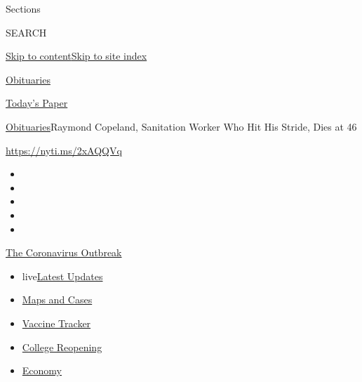 Sections

SEARCH

\protect\hyperlink{site-content}{Skip to
content}\protect\hyperlink{site-index}{Skip to site index}

\href{https://www.nytimes3xbfgragh.onion/section/obituaries}{Obituaries}

\href{https://myaccount.nytimes3xbfgragh.onion/auth/login?response_type=cookie\&client_id=vi}{}

\href{https://www.nytimes3xbfgragh.onion/section/todayspaper}{Today's
Paper}

\href{/section/obituaries}{Obituaries}\textbar{}Raymond Copeland,
Sanitation Worker Who Hit His Stride, Dies at 46

\url{https://nyti.ms/2xAQQVq}

\begin{itemize}
\item
\item
\item
\item
\item
\end{itemize}

\href{https://www.nytimes3xbfgragh.onion/news-event/coronavirus?action=click\&pgtype=Article\&state=default\&region=TOP_BANNER\&context=storylines_menu}{The
Coronavirus Outbreak}

\begin{itemize}
\tightlist
\item
  live\href{https://www.nytimes3xbfgragh.onion/2020/08/04/world/coronavirus-covid-19.html?action=click\&pgtype=Article\&state=default\&region=TOP_BANNER\&context=storylines_menu}{Latest
  Updates}
\item
  \href{https://www.nytimes3xbfgragh.onion/interactive/2020/us/coronavirus-us-cases.html?action=click\&pgtype=Article\&state=default\&region=TOP_BANNER\&context=storylines_menu}{Maps
  and Cases}
\item
  \href{https://www.nytimes3xbfgragh.onion/interactive/2020/science/coronavirus-vaccine-tracker.html?action=click\&pgtype=Article\&state=default\&region=TOP_BANNER\&context=storylines_menu}{Vaccine
  Tracker}
\item
  \href{https://www.nytimes3xbfgragh.onion/2020/08/02/us/covid-college-reopening.html?action=click\&pgtype=Article\&state=default\&region=TOP_BANNER\&context=storylines_menu}{College
  Reopening}
\item
  \href{https://www.nytimes3xbfgragh.onion/live/2020/08/03/business/stock-market-today-coronavirus?action=click\&pgtype=Article\&state=default\&region=TOP_BANNER\&context=storylines_menu}{Economy}
\end{itemize}

